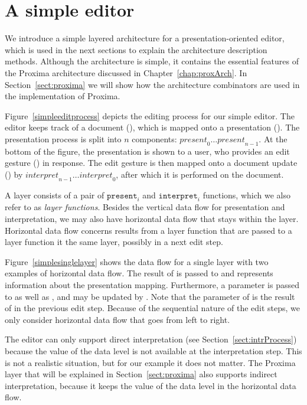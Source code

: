 \documentclass[preprint,natbib]{sigplanconf}
\begin{document}
\section{A simple editor}


We introduce a simple layered architecture for a presentation-oriented editor, which is used in the next sections to explain the architecture description methods. Although the architecture is simple, it contains the essential features of the Proxima architecture discussed in Chapter~\ref{chap:proxArch}. In Section~\ref{sect:proxima} we will show how the architecture combinators are used in the implementation of Proxima.

Figure~\ref{simpleeditprocess} depicts the editing process for our simple editor. The editor keeps track of a document (), which is mapped onto a presentation (). The presentation process is split into $n$ components: $\mathit{present}_0 \dots \mathit{present}_{n-1}$. At the bottom of the figure, the presentation is shown to a user, who provides an edit gesture () in response. The edit gesture is then mapped onto a document update () by $\mathit{interpret}_{n-1} \dots \mathit{interpret}_0$, after which it is performed on the document.


A layer consists of a pair of $\mathtt{present}_i$ and $\mathtt{interpret}_i$ functions, which we also refer to as {\em layer functions}. Besides the vertical data flow for presentation and interpretation, we may also have horizontal data flow that stays within the layer. Horizontal data flow concerns results from a layer function that are passed to a layer function it the same layer, possibly in a next edit step.

Figure~\ref{simplesinglelayer} shows the data flow for a single layer with two examples of horizontal data flow. The  result of  is passed to  and represents information about the presentation mapping. Furthermore, a  parameter is passed to  as well as , and may be updated by . Note that the  parameter of  is the result of  in the previous edit step. Because of the sequential nature of the edit steps, we only consider horizontal data flow that goes from left to right.

The editor can only support direct interpretation (see Section~\ref{sect:intrProcess}) because the value of the data level is not available at the interpretation step. This is not a realistic situation, but for our example it does not matter. The Proxima layer that will be explained in Section~\ref{sect:proxima} also supports indirect interpretation, because it keeps the value of the data level in the horizontal data flow.
\end{document}

